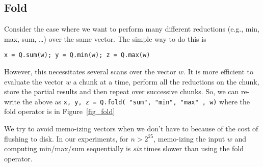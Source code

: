 \subsection{Fold}
\label{fold}
Consider the case where we want to perform many different reductions (e.g., min,
max, sum, \ldots) over the same vector. The simple way to do this is
\begin{verbatim}
x = Q.sum(w); y = Q.min(w); z = Q.max(w)
\end{verbatim}
However, this necessitates several scans over the vector \(w\). It is more
efficient to evaluate the vector \(w\) a chunk at a time, perform all the
reductions on the chunk, store the partial results and then repeat over
successive chunks. So, we can re-write the above as 
{\tt x, y, z = Q.fold({ "sum", "min", "max" }, w)}
where the fold operator is in Figure~\ref{fig_fold}

\begin{figure}
\centering
{}
\end{figure}
We try to avoid memo-izing vectors when we don't have to because 
of the cost of flushing to disk. In our experiments, for \(n > 2^{25}\), 
memo-izing the input \(w\) and computing min/max/sum sequentially 
is {\em six} times slower than using the fold operator.
